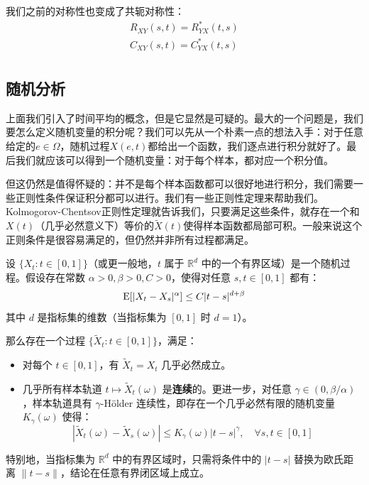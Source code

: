 我们之前的对称性也变成了共轭对称性：
\begin{gather*}
R_{XY}(s,t) = R_{YX}^*(t,s)\\
C_{XY}(s,t) = C_{YX}^*(t,s)\\
\end{gather*}

\subsection{随机分析}
上面我们引入了时间平均的概念，但是它显然是可疑的。最大的一个问题是，我们要怎么定义随机变量的积分呢？我们可以先从一个朴素一点的想法入手：对于任意给定的\(e\in \Omega\)，随机过程\(X(e,t)\)都给出一个函数，我们逐点进行积分就好了。最后我们就应该可以得到一个随机变量：对于每个样本，都对应一个积分值。

但这仍然是值得怀疑的：并不是每个样本函数都可以很好地进行积分，我们需要一些正则性条件保证积分都可以进行。我们有一些正则性定理来帮助我们。Kolmogorov-Chentsov正则性定理就告诉我们，只要满足这些条件，就存在一个和\(X(t)\)（几乎必然意义下）等价的\(\tilde{X}(t)\)使得样本函数都局部可积。一般来说这个正则条件是很容易满足的，但仍然并非所有过程都满足。

\begin{theorem}
设 $\{X_t : t \in [0,1]\}$（或更一般地，$t$ 属于 $\mathbb{R}^d$ 中的一个有界区域）是一个随机过程。假设存在常数 $\alpha > 0, \beta > 0, C > 0$，使得对任意 $s, t \in [0,1]$ 都有：
\[
\operatorname{E}[|X_t - X_s|^\alpha] \le C |t - s|^{d + \beta}
\]
其中 $d$ 是指标集的维数（当指标集为 $[0,1]$ 时 $d=1$）。

那么存在一个过程 $\{\tilde{X}_t : t \in [0,1]\}$，满足：

\begin{itemize}
    \item 对每个 $t \in [0,1]$，有 $\tilde{X}_t = X_t$ 几乎必然成立。
    \item 几乎所有样本轨道 $t \mapsto \tilde{X}_t(\omega)$ 是\textbf{连续}的。更进一步，对任意 $\gamma \in (0, \beta/\alpha)$，样本轨道具有 $\gamma$-Hölder 连续性，即存在一个几乎必然有限的随机变量 $K_\gamma(\omega)$ 使得：
    \[
    |\tilde{X}_t(\omega) - \tilde{X}_s(\omega)| \le K_\gamma(\omega) |t-s|^\gamma, \quad \forall s, t \in [0,1]
    \]
\end{itemize}

特别地，当指标集为 $\mathbb{R}^d$ 中的有界区域时，只需将条件中的 $|t-s|$ 替换为欧氏距离 $\|t-s\|$，结论在任意有界闭区域上成立。
\end{theorem}

